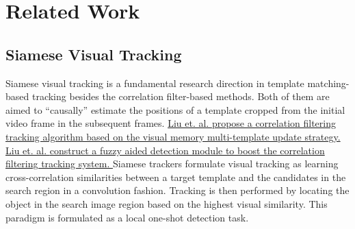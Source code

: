 \documentclass[journal]{IEEEtran}
\begin{document}
\section{Related Work}

\subsection{Siamese Visual Tracking}

Siamese visual tracking is a fundamental research direction in template matching-based tracking besides the correlation filter-based methods. Both of them are aimed to ``causally'' estimate the positions of a template cropped from the initial video frame in the subsequent frames.
\uline{
Liu et. al. \cite{9376997} propose a correlation filtering tracking algorithm based on the visual memory multi-template update strategy.
Liu et. al. \cite{9132673} construct a fuzzy aided detection module to boost the correlation filtering tracking system.
}
Siamese trackers formulate visual tracking as learning cross-correlation similarities between a target template and the candidates in the search region in a convolution fashion. Tracking is then performed by locating the object in the search image region based on the highest visual similarity. This paradigm is formulated as a local one-shot detection task.
\end{document}
